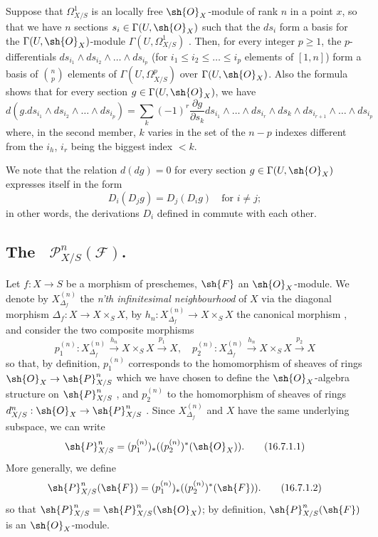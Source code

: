 \begin{env}[16.6.5]
\label{IV.16.6.5}
Suppose that $\Omega_{X/S}^1$ is an locally free $\sh{O}_X$-module of rank $n$ in a point $x$, so that we have $n$ sections $s_i \in \Gamma(U, \sh{O}_X)$ such that the $ds_i$ form a basis for the $\Gamma(U, \sh{O}_X)$-module $\Gamma(U, \Omega_{X/S}^1)$ .
Then, for every integer $p \geq 1$, the $p$-differentials $ds_{i_1} \wedge ds_{i_2} \wedge \dots \wedge ds_{i_p}$ (for $i_1 \leq i_2 \leq \dots \leq i_p$ elements of $[1,n]$) form a basis of $\binom{n}{p}$ elements of $\Gamma(U, \Omega_{X/S}^p)$ over $\Gamma(U, \sh{O}_X)$.
Also the formula  shows that for every section $g \in \Gamma(U, \sh{O}_X)$, we have
\[
  \label{IV.16.6.5.1}
  d(g.ds_{i_1} \wedge ds_{i_2} \wedge \dots \wedge ds_{i_p}) = \sum_k (-1)^r \frac{\partial g}{\partial s_k} ds_{i_1} \wedge \dots \wedge ds_{i_r} \wedge ds_k \wedge ds_{i_{r+1}} \wedge \dots \wedge ds_{i_p}
  \tag{16.6.5.1}
\]
where, in the second member, $k$ varies in the set of the $n - p$ indexes different from the $i_h$, $i_r$ being the biggest index $<k$.

We note that the relation $d(dg) = 0$ for every section $g \in \Gamma(U, \sh{O}_X)$ expresses itself in the form
\[
  D_i(D_j g) = D_j(D_i g) \quad \text{for $i \neq j$};
\]
in other words, the derivations $D_i$ defined in  commute with each other.
\end{env}

\subsection{The ~$\mathcal{P}_{X/S}^n(\mathcal{F})$.}
\label{IV.16.7}

\begin{env}[16.7.1]
\label{IV.16.7.1}
Let $f:X \to S$ be a morphism of preschemes, $\sh{F}$ an $\sh{O}_X$-module.
We denote by $X_{\Delta_f}^{(n)}$ the \emph{n'th infinitesimal neighbourhood} of $X$ via the diagonal morphism
$\Delta_f: X \to X \times_S X$, by $h_n:X_{\Delta_f}^{(n)} \to X \times_S X$ the canonical morphism , and consider the two composite morphisms
\[
  p_1^{(n)}:X_{\Delta_f}^{(n)} \xrightarrow{h_n} X \times_S X \xrightarrow{p_1} X, \quad 
  p_2^{(n)}:X_{\Delta_f}^{(n)} \xrightarrow{h_n} X \times_S X \xrightarrow{p_2} X
\]
so that, by definition, $p_1^{(n)}$ corresponds to the homomorphism of sheaves of rings $\sh{O}_X \to \sh{P}_{X/S}^n$ which we have chosen to define the $\sh{O}_X$-algebra structure on $\sh{P}_{X/S}^n$ , and $p_2^{(n)}$ to the homomorphism of sheaves of rings $d^n_{X/S}:\sh{O}_X \to \sh{P}_{X/S}^n$ .
Since $X_{\Delta_f}^{(n)}$ and $X$ have the same underlying subspace, we can write
\[
  \label{IV.16.7.1.1}
  \sh{P}_{X/S}^n = (p_1^{(n)})_* ((p_2^{(n)})^* (\sh{O}_X)).
  \tag{16.7.1.1}
\]
More generally, we define
\[
  \label{IV.16.7.1.2}
  \sh{P}_{X/S}^n(\sh{F}) = (p_1^{(n)})_* ((p_2^{(n)})^* (\sh{F})).
  \tag{16.7.1.2}
\]
so that $\sh{P}_{X/S}^n = \sh{P}_{X/S}^n(\sh{O}_X)$;
by definition, $\sh{P}_{X/S}^n(\sh{F})$ is an $\sh{O}_X$-module.
\end{env}

